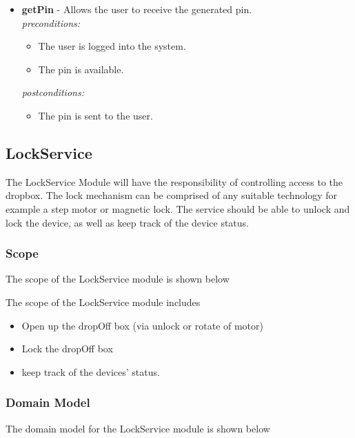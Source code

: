 \documentclass[a4paper,12pt]{article}
\begin{document}
\begin{itemize}
		\item \textbf{getPin} - Allows the user to receive the generated pin.\\[0.5cm]
		\textit{preconditions:}
		\begin{itemize}
			\item The user is logged into the system.
			\item The pin is available.
		\end{itemize}
		
		\textit{postconditions:}
		\begin{itemize}
			\item The pin is sent to the user.\\[0.5cm]
		\end{itemize}
	\end{itemize}
	\newpage
	
	\subsection{LockService}
	The LockService Module will have the responsibility of controlling access to the dropbox. The lock mechanism can be comprised of any suitable technology for example a step motor or magnetic lock. The service should be able to unlock and lock the device, as well as keep track of the device status.
	
	\subsubsection{Scope}
	The scope of the LockService module is shown below
	
	
	{\noindent}The scope of the LockService module includes
	\begin{itemize}
		\item Open up the dropOff box (via unlock or rotate of motor)
		\item Lock the dropOff box
		\item keep track of the devices' status.
	\end{itemize}
	
	\subsubsection{Domain Model}
	The domain model for the LockService module is shown below
	
\end{document}
